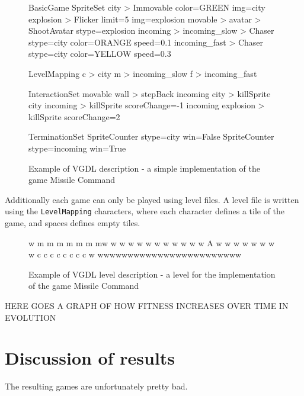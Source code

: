 \documentclass[a4paper,titlepage,final]{report}
\begin{document}
\begin{figure}[!ht]
\centering
\begin{vgdldesc}[linewidth=14cm]
BasicGame
	SpriteSet
		city  > Immovable color=GREEN img=city
		explosion > Flicker limit=5 img=explosion
		movable >
			avatar  > ShootAvatar stype=explosion
			incoming >
				incoming_slow  > Chaser stype=city color=ORANGE speed=0.1
				incoming_fast  > Chaser stype=city color=YELLOW speed=0.3

	LevelMapping
		c > city
		m > incoming_slow
		f > incoming_fast
		
	InteractionSet
		movable wall  > stepBack
		incoming city > killSprite
		city incoming > killSprite scoreChange=-1
		incoming explosion > killSprite scoreChange=2

	TerminationSet
		SpriteCounter stype=city   win=False
		SpriteCounter stype=incoming win=True
\end{vgdldesc}
\caption{Example of VGDL description - a simple implementation of the game Missile Command}
\label{fig:evolved_vgdlgame}
\end{figure}

Additionally each game can only be played using level files. 
A level file is written using the \texttt{LevelMapping} characters, where each character defines a tile of the game, and spaces defines empty tiles.

\begin{figure}[!ht]
\centering
\begin{vgdldesc}[linewidth=14cm]
w    m  m   m  m  m m mw
w                      w
w                      w
w                      w
w                      w
w                      w
w           A          w
w                      w
w                      w
w                      w
w   c c c c c c c c    w
wwwwwwwwwwwwwwwwwwwwwwww
\end{vgdldesc}
\caption{Example of VGDL level description - a level for the implementation of the game Missile Command}
\label{fig:evolved_vgdlgame_level}
\end{figure}


HERE GOES A GRAPH OF HOW FITNESS INCREASES OVER TIME IN EVOLUTION



\section{Discussion of results}
\label{sec_task2discussion}
The resulting games are unfortunately pretty bad.
\end{document}
